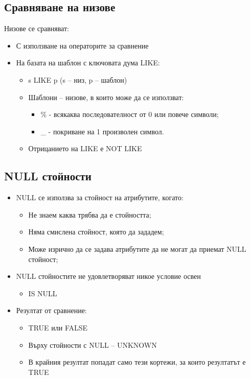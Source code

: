 \subsection{Сравняване на низове}
Низове се сравняват:
\begin{itemize}
    \item С използване на операторите за сравнение
    \item На базата на шаблон с ключовата дума LIKE:
    \begin{itemize}
        \item s LIKE p (s – низ, p – шаблон)
        \item Шаблони – низове, в които може да се използват:
        \begin{itemize}
            \item[] \% - всякаква последователност от 0 или повече символи;
            \item[] \_ - покриване на 1 произволен символ.
        \end{itemize}
        \item Отрицанието на LIKE е NOT LIKE
    \end{itemize}
\end{itemize}

\subsection{NULL стойности}
\begin{itemize}
    \item NULL се използва за стойност на атрибутите, когато:
    \begin{itemize}
        \item Не знаем каква трябва да е стойността;
        \item Няма смислена стойност, която да зададем;
        \item Може изрично да се задава атрибутите да не могат да приемат NULL стойност;
    \end{itemize}
    \item NULL стойностите не удовлетворяват никое условие освен
    \begin{itemize}
        \item IS NULL
    \end{itemize}
    \item Резултат от сравнение:
    \begin{itemize}
        \item TRUE или FALSE
        \item Върху стойности с NULL – UNKNOWN
        \item В крайния резултат попадат само тези кортежи, за които резултатът е TRUE
    \end{itemize}
\end{itemize}

